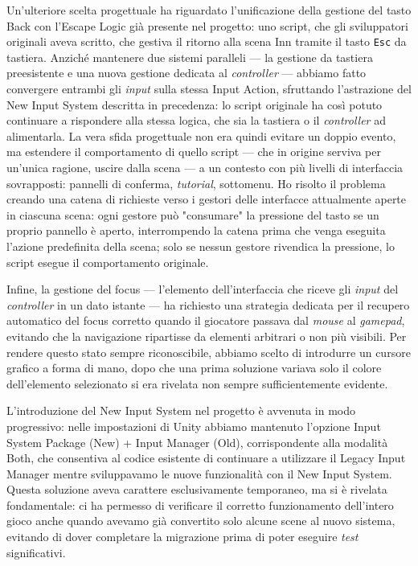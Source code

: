 Un'ulteriore scelta progettuale ha riguardato l'unificazione della gestione del tasto Back con l'Escape Logic già presente nel progetto: uno script, che gli sviluppatori originali aveva scritto, che gestiva il ritorno alla scena Inn tramite il tasto \texttt{Esc} da tastiera. Anziché mantenere due sistemi paralleli — la gestione da tastiera preesistente e una nuova gestione dedicata al \textit{controller} — abbiamo fatto convergere entrambi gli \textit{input} sulla stessa Input Action, sfruttando l'astrazione del New Input System descritta in precedenza: lo script originale ha così potuto continuare a rispondere alla stessa logica, che sia la tastiera o il \textit{controller} ad alimentarla. La vera sfida progettuale non era quindi evitare un doppio evento, ma estendere il comportamento di quello script — che in origine serviva per un'unica ragione, uscire dalla scena — a un contesto con più livelli di interfaccia sovrapposti: pannelli di conferma, \textit{tutorial}, sottomenu. Ho risolto il problema creando una catena di richieste verso i gestori delle interfacce attualmente aperte in ciascuna scena: ogni gestore può "consumare" la pressione del tasto se un proprio pannello è aperto, interrompendo la catena prima che venga eseguita l'azione predefinita della scena; solo se nessun gestore rivendica la pressione, lo script esegue il comportamento originale.
 
Infine, la gestione del focus — l'elemento dell'interfaccia che riceve gli \textit{input} del \textit{controller} in un dato istante — ha richiesto una strategia dedicata per il recupero automatico del focus corretto quando il giocatore passava dal \textit{mouse} al \textit{gamepad}, evitando che la navigazione ripartisse da elementi arbitrari o non più visibili. Per rendere questo stato sempre riconoscibile, abbiamo scelto di introdurre un cursore grafico a forma di mano, dopo che una prima soluzione variava solo il colore dell'elemento selezionato si era rivelata non sempre sufficientemente evidente.
 
L'introduzione del New Input System nel progetto è avvenuta in modo progressivo: nelle impostazioni di Unity abbiamo mantenuto l'opzione Input System Package (New) + Input Manager (Old), corrispondente alla modalità Both, che consentiva al codice esistente di continuare a utilizzare il Legacy Input Manager mentre sviluppavamo le nuove funzionalità con il New Input System. Questa soluzione aveva carattere esclusivamente temporaneo, ma si è rivelata fondamentale: ci ha permesso di verificare il corretto funzionamento dell'intero gioco anche quando avevamo già convertito solo alcune scene al nuovo sistema, evitando di dover completare la migrazione prima di poter eseguire \textit{test} significativi.
 
